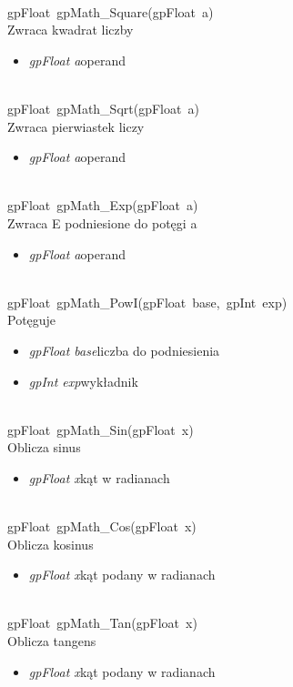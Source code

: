  \ \\
\mbox{\textsf{gpFloat gpMath_Square(gpFloat a)}} \\ \indent Zwraca kwadrat liczby
	\begin{itemize}
		\item \textit{gpFloat a}\quad operand
	\end{itemize}

 \ \\
\mbox{\textsf{gpFloat gpMath_Sqrt(gpFloat a)}} \\ \indent Zwraca pierwiastek liczy
	\begin{itemize}
		\item \textit{gpFloat a}\quad operand
	\end{itemize}

 \ \\
\mbox{\textsf{gpFloat gpMath_Exp(gpFloat a)}} \\ \indent Zwraca E podniesione do potęgi a
	\begin{itemize}
		\item \textit{gpFloat a}\quad operand
	\end{itemize}

 \ \\
\mbox{\textsf{gpFloat gpMath_PowI(gpFloat base, gpInt exp)}} \\ \indent Potęguje
	\begin{itemize}
		\item \textit{gpFloat base}\quad liczba do podniesienia
		\item \textit{gpInt exp}\quad wykładnik
	\end{itemize}

 \ \\
\mbox{\textsf{gpFloat gpMath_Sin(gpFloat x)}} \\ \indent Oblicza sinus
	\begin{itemize}
		\item \textit{gpFloat x}\quad kąt w radianach
	\end{itemize}

 \ \\
\mbox{\textsf{gpFloat gpMath_Cos(gpFloat x)}} \\ \indent Oblicza kosinus
	\begin{itemize}
		\item \textit{gpFloat x}\quad kąt podany w radianach
	\end{itemize}

 \ \\
\mbox{\textsf{gpFloat gpMath_Tan(gpFloat x)}} \\ \indent Oblicza tangens
	\begin{itemize}
		\item \textit{gpFloat x}\quad kąt podany w radianach
	\end{itemize}

